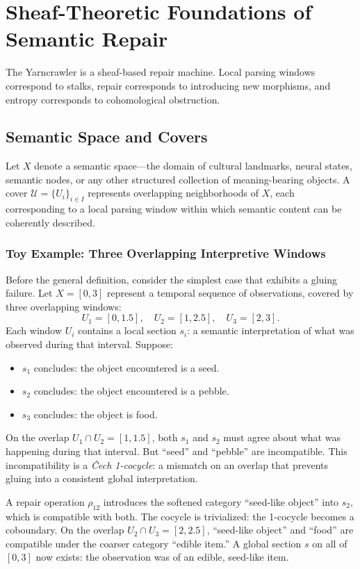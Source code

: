 \chapter{Sheaf-Theoretic Foundations of Semantic Repair}
\label{ch:sheaf}

\epigraph{The Yarncrawler is a sheaf-based repair machine. Local parsing windows
correspond to stalks, repair corresponds to introducing new morphisms, and entropy
corresponds to cohomological obstruction.}{}

\section{Semantic Space and Covers}

Let $X$ denote a semantic space---the domain of cultural landmarks, neural states,
semantic nodes, or any other structured collection of meaning-bearing objects. A
cover $\mathcal{U} = \{U_i\}_{i \in I}$ represents overlapping neighborhoods of
$X$, each corresponding to a local parsing window within which semantic content
can be coherently described.

\subsection*{Toy Example: Three Overlapping Interpretive Windows}

Before the general definition, consider the simplest case that exhibits a gluing
failure. Let $X = [0,3]$ represent a temporal sequence of observations, covered
by three overlapping windows:
\[
  U_1 = [0, 1.5], \quad U_2 = [1, 2.5], \quad U_3 = [2, 3].
\]
Each window $U_i$ contains a local section $s_i$: a semantic interpretation of
what was observed during that interval. Suppose:
\begin{itemize}
  \item $s_1$ concludes: the object encountered is a seed.
  \item $s_2$ concludes: the object encountered is a pebble.
  \item $s_3$ concludes: the object is food.
\end{itemize}
On the overlap $U_1 \cap U_2 = [1, 1.5]$, both $s_1$ and $s_2$ must agree about
what was happening during that interval. But ``seed'' and ``pebble'' are
incompatible. This incompatibility is a \emph{Čech 1-cocycle}: a mismatch on
an overlap that prevents gluing into a consistent global interpretation.

A repair operation $\rho_{12}$ introduces the softened category ``seed-like
object'' into $s_2$, which is compatible with both. The cocycle is trivialized:
the 1-cocycle becomes a coboundary. On the overlap $U_2 \cap U_3 = [2, 2.5]$,
``seed-like object'' and ``food'' are compatible under the coarser category
``edible item.'' A global section $s$ on all of $[0,3]$ now exists: the
observation was of an edible, seed-like item.

